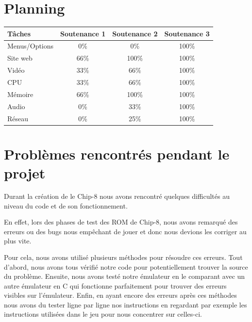 \documentclass[12pt, a4paper]{article}
\begin{document}
\bigskip
\section{Planning}
\begin{center}
\begin{tabular}{|l|c|c|c|}
\hline
\bf Tâches          & \bf Soutenance 1      & \bf Soutenance 2      & \bf Soutenance 3  \\
\hline 
Menus/Options       &      0\%              &         0\%           & 100\%  \\
\hline 
Site web            &        66\%           &        100\%          & 100\%  \\
\hline 
Vidéo               &       33\%            &         66\%          & 100\%  \\
\hline 
CPU                 & 33\%                  &  66\%                 & 100\%  \\
\hline 
Mémoire             & 66\%                  & 100\%                 & 100\%  \\
\hline
Audio               &    0\%                & 33\%                  & 100\%  \\
\hline
Réseau              & 0\%                   & 25\%                  & 100\%  \\

\hline
\end{tabular}
\end{center}
\pagebreak
\section{Problèmes rencontrés pendant le projet}

Durant la création de le Chip-8 nous avons rencontré quelques difficultés au niveau du code et de son fonctionnement.

En effet, lors des phases de test des ROM de Chip-8, nous avons remarqué des erreurs ou des bugs nous empêchant de jouer et donc nous devions les corriger au plus vite. 

\bigskip
Pour cela, nous avons utilisé plusieurs méthodes pour résoudre ces erreurs. Tout d'abord, nous avons tous vérifié notre code pour potentiellement trouver la source du problème. Ensuite, nous avons testé notre émulateur en le comparant avec un autre émulateur en C qui fonctionne parfaitement pour trouver des erreurs visibles sur l'émulateur. Enfin, en ayant encore des erreurs après ces méthodes nous avons du tester ligne par ligne nos instructions en regardant par exemple les instructions utilisées dans le jeu pour nous concentrer sur celles-ci.
\end{document}
